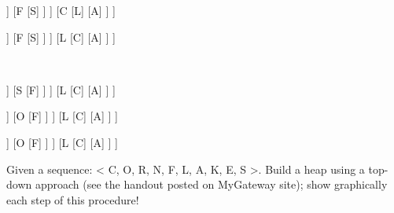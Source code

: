 \documentclass[12pt,largemargins]{homework}
\begin{document}
\begin{forest}
	[R
		[O
			[N
				[K]
				[E]
			]
			[F
				[S]
			]
		]
		[C
			[L]
			[A]
		]
	]
\end{forest}
\begin{forest}
	[R
		[O
			[N
				[K]
				[E]
			]
			[F
				[S]
			]
		]
		[L
			[C]
			[A]
		]
	]
\end{forest}\\
\begin{forest}
	[R
		[O
			[N
				[K]
				[E]
			]
			[S
				[F]
			]
		]
		[L
			[C]
			[A]
		]
	]
\end{forest}
\begin{forest}
	[R
		[S
			[N
				[K]
				[E]
			]
			[O
				[F]
			]
		]
		[L
			[C]
			[A]
		]
	]
\end{forest}
\begin{forest}
	[S
		[R
			[N
				[K]
				[E]
			]
			[O
				[F]
			]
		]
		[L
			[C]
			[A]
		]
	]
\end{forest}
\question
Given a sequence: < C, O, R, N, F, L, A, K, E, S >. Build a heap using a top-down approach (see the handout posted on MyGateway site); show graphically each step of this procedure!\\
\end{document}
